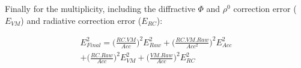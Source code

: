 \documentclass[letterpaper,12pt]{article}
\begin{document}
Finally for the multiplicity, including the diffractive $\Phi$ and $\rho^0$ correction error ($E_{VM}$) and radiative correction error ($E_{RC}$):

\begin{equation}
\begin{split}
		E^2_{Final} = \bigg( \frac{RC.VM}{Acc} \bigg)^2 E^2_{Raw} + \bigg(\frac{RC.VM.Raw}{Acc^2} \bigg)^2 E^2_{Acc} \\
		+ \bigg(\frac{RC.Raw}{Acc} \bigg)^2 E^2_{VM} + \bigg(\frac{VM.Raw}{Acc} \bigg)^2 E^2_{RC}
\end{split}
\end{equation}


\begin{thebibliography}{99}


\end{thebibliography}
\end{document}
